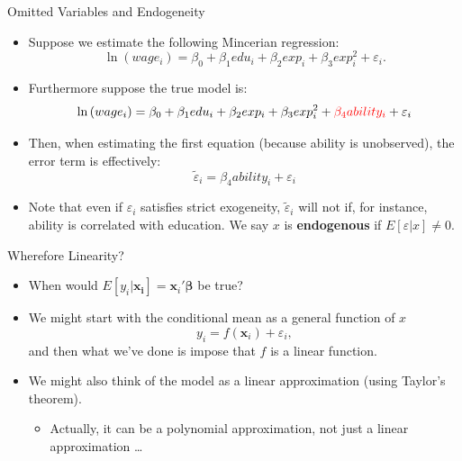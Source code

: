 \documentclass[aspectratio=169,11pt]{beamer}
\begin{document}
\begin{frame}{Omitted Variables and Endogeneity}
\begin{itemize}
	\item Suppose we estimate the following Mincerian regression:\[
\ln \left(wage_{i}\right)=\beta_{0}+\beta_{1}edu_{i}+\beta_{2}exp_{i}+\beta_{3}exp_{i}^{2}+\varepsilon_{i}.
\]

	\item Furthermore suppose the true model is:\[
\ln \left(wage_{i}\right)=\beta_{0}+\beta_{1}edu_{i}+\beta_{2}exp_{i}+\beta_{3}exp_{i}^{2}+ \textcolor{red}{\beta_4 ability_{i}} + \varepsilon_{i}
\]

	\item Then, when estimating the first equation (because ability is unobserved), the error term is effectively:\[
	\widetilde{\varepsilon}_{i} = \beta_4 ability_{i} + \varepsilon_{i}
\]


\item Note that even if $\varepsilon_{i}$ satisfies strict exogeneity, $\widetilde{\varepsilon}_{i}$ will not
 	if, for instance, ability is correlated with education. We say $x$ is {\bf endogenous} if $E\left[\varepsilon|x\right]\ne 0$.


\end{itemize}
\end{frame}



\begin{frame}{Wherefore Linearity?}
\begin{itemize}
	\item When would $E\left[y_i|\boldsymbol{x_i}\right] = \boldsymbol{x}_i'\boldsymbol{\beta}$ be true?

	\medskip
	\item We might start with the conditional mean as a general function of $x$\[
	 y_{i} = f\left(\boldsymbol{x}_{i}\right)+\varepsilon_{i},
	\]
	and then what we've done is impose that $f$ is a linear function. 

		\medskip
	\item We might also think of the model as a linear approximation (using Taylor's theorem). 
	\begin{itemize}
		\item Actually, it can be a polynomial approximation, not just a linear approximation \dots
	\end{itemize}
\end{itemize}
\end{frame}
\end{document}
